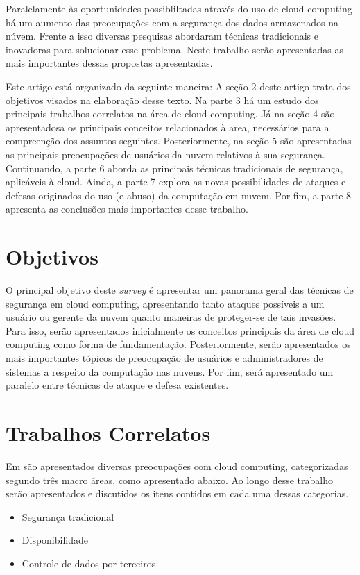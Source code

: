 \documentclass[brazil,12pt]{article}
\begin{document}
Paralelamente às oportunidades possibliltadas através do uso de cloud computing
há um aumento das preocupações com a segurança dos dados armazenados na núvem.
Frente a isso diversas pesquisas abordaram técnicas tradicionais e inovadoras
para solucionar esse problema. Neste trabalho serão apresentadas as mais
importantes dessas propostas apresentadas.

Este artigo está organizado da seguinte maneira: A seção 2 deste artigo trata
dos objetivos visados na elaboração desse texto. Na parte 3 há um estudo dos
principais trabalhos correlatos na área de cloud computing. Já na seção 4 são
apresentadosa os principais conceitos relacionados à area, necessários para a
compreenção dos assuntos seguintes. Posteriormente, na seção 5 são apresentadas
as principais preocupações de usuários da nuvem relativos à sua segurança.
Continuando, a parte 6 aborda as principais técnicas tradicionais de segurança,
aplicáveis à cloud. Ainda, a parte 7 explora as novas possibilidades de ataques
e defesas originados do uso (e abuso) da computação em nuvem. Por fim, a parte 8
apresenta as conclusões mais importantes desse trabalho.

\section{Objetivos}
O principal objetivo deste \emph{survey} é apresentar um panorama geral das
técnicas de segurança em cloud computing, apresentando tanto ataques possíveis a
um usuário ou gerente da nuvem quanto maneiras de proteger-se de tais invasões.
Para isso, serão apresentados inicialmente os conceitos principais da área
de cloud computing como forma de fundamentação. Posteriormente, serão
apresentados os mais importantes tópicos de preocupação de usuários e
administradores de sistemas a respeito da computação nas nuvens. Por fim, será
apresentado um paralelo entre técnicas de ataque e defesa existentes.

\section{Trabalhos Correlatos}

Em \cite{controlling-data-in-cloud} são apresentados diversas preocupações com
cloud computing, categorizadas segundo três macro áreas, como apresentado
abaixo. Ao longo desse trabalho serão apresentados e discutidos os itens contidos em cada uma dessas
categorias.
\begin{itemize}
  \item Segurança tradicional
  \item Disponibilidade
  \item Controle de dados por terceiros
\end{itemize}
\end{document}
